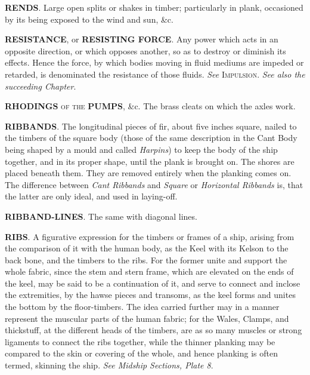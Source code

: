 \textbf{RENDS}. Large open splits or shakes in timber; particularly in plank, occasioned by its being exposed to the wind and sun, \&c. 

\textbf{RESISTANCE}, or \textbf{RESISTING FORCE}. Any power which acts in an opposite direction, or which opposes another, so as to destroy or diminish its effects. Hence the force, by which bodies moving in fluid mediums are impeded or retarded, is denominated the resistance of those fluids. \textit{See} \textsc{Impulsion}. \textit{See also the succeeding Chapter}. 

\textbf{RHODINGS} \textsc{of the} \textbf{PUMPS}, \&c. The brass cleats on which the axles work. 

\textbf{RIBBANDS}. The longitudinal pieces of fir, about five inches square, nailed to the timbers of the square body (those of the same description in the Cant Body being shaped by a mould and called \textit{Harpins}) to keep the body of the ship together, and in its proper shape, until the plank is brought on. The shores are placed beneath them. They are removed entirely when the planking comes on. The difference between \textit{Cant Ribbands} and \textit{Square} or \textit{Horizontal Ribbands} is, that the latter are only ideal, and used in laying-off. 

\textbf{RIBBAND-LINES}. The same with diagonal lines. 

\textbf{RIBS}. A figurative expression for the timbers or frames of a ship, arising from the comparison of it with the human body, as the Keel with its Kelson to the back bone, and the timbers to the ribs. For the former unite and support the whole fabric, since the stem and stern frame, which are elevated on the ends of the keel, may be said to be a continuation of it, and serve to connect and inclose the extremities, by the hawse pieces and transoms, as the keel forms and unites the bottom by the floor-timbers. The idea carried further may in a manner represent the muscular parts of the human fabric; for the Wales, Clamps, and thickstuff, at the different heads of the timbers, are as so many muscles or strong ligaments to connect the ribs together, while the thinner planking may be compared to the skin or covering of the whole, and hence planking is often termed, skinning the ship. \textit{See Midship Sections, Plate 8}. 


